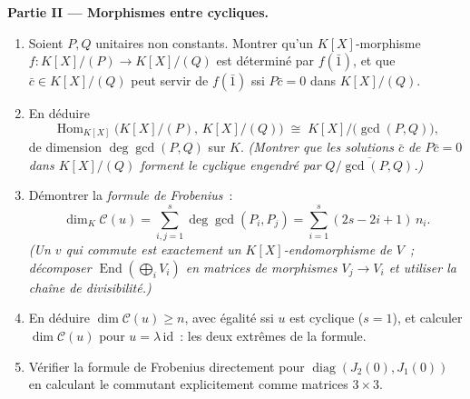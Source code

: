 \begin{problem}
\medskip
\noindent\textbf{Partie II --- Morphismes entre 
cycliques.}
\begin{enumerate}[resume]
  \item Soient $P, Q$ unitaires non constants. Montrer qu'un
        $K[X]$-morphisme $f \colon K[X]/(P) \to K[X]/(Q)$ est
        déterminé par $f(\bar 1)$, et que $\bar c \in K[X]/(Q)$
        peut servir de $f(\bar 1)$ ssi $P\bar c = 0$ dans
        $K[X]/(Q)$.
  \item En déduire
        \[
        \operatorname{Hom}_{K[X]}\bigl(K[X]/(P),\, K[X]/(Q)\bigr)
        \;\cong\; K[X]\big/\bigl(\gcd(P, Q)\bigr),
        \]
        de dimension $\deg \gcd(P, Q)$ sur $K$. \emph{(Montrer
        que les solutions $\bar c$ de $P\bar c = 0$ dans
        $K[X]/(Q)$ forment le  cyclique engendré par
        $\overline{Q/\gcd(P,Q)}$.)}
  \item Démontrer la \emph{formule de Frobenius}~:
        \[
        \dim_K \mathcal C(u) = \sum_{i,j=1}^{s} \deg\gcd(P_i,
        P_j) = \sum_{i=1}^{s} (2s - 2i + 1)\, n_i .
        \]
        \emph{(Un $v$ qui commute est exactement un
        $K[X]$-endomorphisme de $V$~; décomposer
        $\operatorname{End}(\bigoplus_i V_i)$ en matrices de
        morphismes $V_j \to V_i$ et utiliser la chaîne de
        divisibilité.)}
  \item En déduire $\dim \mathcal C(u) \geq n$, avec égalité ssi
        $u$ est cyclique ($s = 1$), et calculer $\dim\mathcal
        C(u)$ pour $u = \lambda\,\mathrm{id}$~: les deux
        extrêmes de la formule.
  \item Vérifier la formule de Frobenius directement pour
        $\operatorname{diag}(J_2(0), J_1(0))$ en calculant le
        commutant explicitement comme matrices $3\times3$.
\end{enumerate}


\end{problem}
